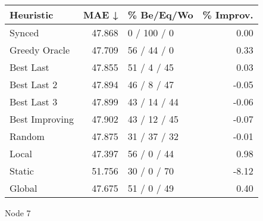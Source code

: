 \begin{tabular}{lrlr}
\toprule
\textbf{Heuristic} & \textbf{MAE ↓} & \textbf{\% Be/Eq/Wo} & \textbf{\% Improv.} \\
\midrule
            Synced &         47.868 &          0 / 100 / 0 &                0.00 \\
     Greedy Oracle &         47.709 &          56 / 44 / 0 &                0.33 \\
         Best Last &         47.855 &          51 / 4 / 45 &                0.03 \\
       Best Last 2 &         47.894 &          46 / 8 / 47 &               -0.05 \\
       Best Last 3 &         47.899 &         43 / 14 / 44 &               -0.06 \\
    Best Improving &         47.902 &         43 / 12 / 45 &               -0.07 \\
            Random &         47.875 &         31 / 37 / 32 &               -0.01 \\
             Local &         47.397 &          56 / 0 / 44 &                0.98 \\
            Static &         51.756 &          30 / 0 / 70 &               -8.12 \\
            Global &         47.675 &          51 / 0 / 49 &                0.40 \\
\bottomrule
\end{tabular}
\caption{Node 7}
\label{tab:iid_lr01_le1_bs4_7}
